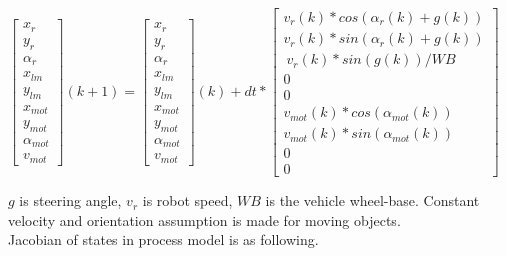 \documentclass[11pt,a4paper]{article}
\begin{document}
$\begin{bmatrix} x_{r} \\ y_{r} \\ \alpha_{r} \\ x_{lm} \\ y_{lm} \\  x_{mot} \\ y_{mot} \\ \alpha_{mot} \\ v_{mot} \end{bmatrix}(k+1) =
 \begin{bmatrix} x_{r} \\ y_{r} \\ \alpha_{r} \\ x_{lm} \\ y_{lm} \\  x_{mot} \\ y_{mot} \\ \alpha_{mot} \\ v_{mot} \end{bmatrix}(k)  + 
dt*\begin{bmatrix} v_{r}(k)*cos(\alpha_{r}(k) + g(k)) \\ v_{r}(k)*sin(\alpha_{r}(k) + g(k)) \\ \ v_{r}(k)*sin(g(k)) / WB \\ 0 \\ 0 \\ v_{mot}(k)*cos(\alpha_{mot}(k)) \\ v_{mot}(k)*sin(\alpha_{mot}(k))  \\ 0 \\ 0 \end{bmatrix} $

\noindent$g$ is steering angle, $v_{r}$ is robot speed, $WB$ is the vehicle wheel-base. Constant velocity and orientation assumption is made for moving objects.
\\

\noindent Jacobian of states in process model is as following.
\end{document}
